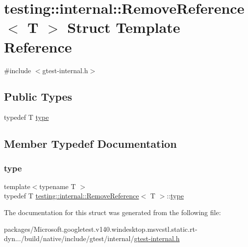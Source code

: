 \hypertarget{structtesting_1_1internal_1_1_remove_reference}{}\section{testing\+::internal\+::Remove\+Reference$<$ T $>$ Struct Template Reference}
\label{structtesting_1_1internal_1_1_remove_reference}


{\ttfamily \#include $<$gtest-\/internal.\+h$>$}

\subsection*{Public Types}
\begin{DoxyCompactItemize}
\item 
typedef T \mbox{\hyperlink{structtesting_1_1internal_1_1_remove_reference_a9ca4f6499579225f7986b789ee4b2895}{type}}
\end{DoxyCompactItemize}


\subsection{Member Typedef Documentation}
\mbox{\label{structtesting_1_1internal_1_1_remove_reference_a9ca4f6499579225f7986b789ee4b2895}} 
\subsubsection{\texorpdfstring{type}{type}}
{\footnotesize\ttfamily template$<$typename T $>$ \\
typedef T \mbox{\hyperlink{structtesting_1_1internal_1_1_remove_reference}{testing\+::internal\+::\+Remove\+Reference}}$<$ T $>$\+::\mbox{\hyperlink{structtesting_1_1internal_1_1_remove_reference_a9ca4f6499579225f7986b789ee4b2895}{type}}}



The documentation for this struct was generated from the following file\+:\begin{DoxyCompactItemize}
\item 
packages/\+Microsoft.\+googletest.\+v140.\+windesktop.\+msvcstl.\+static.\+rt-\/dyn.../build/native/include/gtest/internal/\mbox{\hyperlink{gtest-internal_8h}{gtest-\/internal.\+h}}\end{DoxyCompactItemize}
